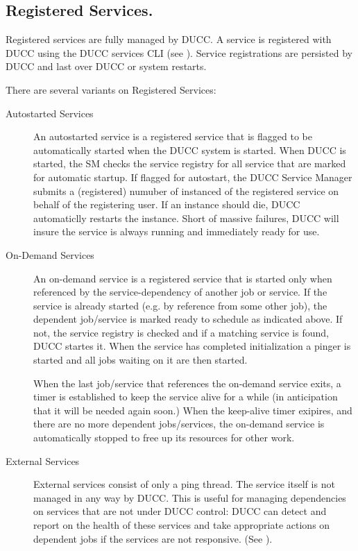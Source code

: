       \subsection{Registered Services.} Registered services are fully managed by DUCC. A service is
      registered with DUCC using the DUCC services CLI (see ). Service
      registrations are persisted by DUCC and last over DUCC or system restarts.  

      There are several variants on Registered Services:
      \begin{description}

        \item[Autostarted Services] An autostarted service is a registered service that is flagged to be
          automatically started when the DUCC system is started. When DUCC is started, the SM checks the
          service registry for all service that are marked for automatic startup.  If flagged for autostart,
          the DUCC Service Manager submits a (registered) numuber of instanced of the registered service
          on behalf of the registering user.  If an instance should die, DUCC automaticlly restarts
          the instance.  Short of massive failures, DUCC will insure the service is always running
          and immediately ready for use.
          
        \item[On-Demand Services] An on-demand service is a registered service that is started only
          when referenced by the service-dependency of another job or service. If the service is
          already started (e.g. by reference from some other job), the dependent job/service is
          marked ready to schedule as indicated above. If not, the service registry is checked and
          if a matching service is found, DUCC startes it. When the service has completed
          initialization a pinger is started and all jobs waiting on it are then started.
          
          When the last job/service that references the on-demand service exits, a timer is
          established to keep the service alive for a while (in anticipation that it will be needed
          again soon.)  When the keep-alive timer exipires, and there are no more dependent
          jobs/services, the on-demand service is automatically stopped to free up its resources for
          other work.

          \item[External Services] External services consist of only a ping thread.  The service
            itself is not managed in any way by DUCC.  This is useful for managing dependencies
            on services that are not under DUCC control: DUCC can detect and report on the health
            of these services and take appropriate actions on dependent jobs if the services
            are not responsive. (See ).
      \end{description}
          
